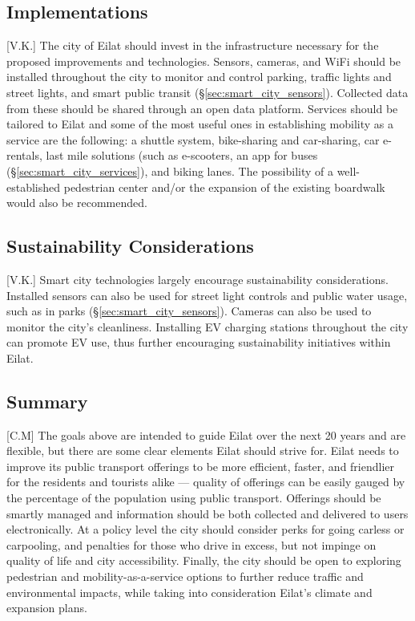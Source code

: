 \documentclass[12pt]{article}                       %
\begin{document}
\subsection{Implementations}[V.K.]
The city of Eilat should invest in the infrastructure necessary for the proposed improvements and technologies. Sensors, cameras, and WiFi should be installed throughout the city to monitor and control parking, traffic lights and street lights, and smart public transit (\S\ref{sec:smart_city_sensors}). Collected data from these should be shared through an open data platform. Services should be tailored to Eilat and some of the most useful ones in establishing mobility as a service are the following: a shuttle system, bike-sharing and car-sharing, car e-rentals, last mile solutions (such as e-scooters, an app for buses (\S\ref{sec:smart_city_services}), and biking lanes. The possibility of a well-established pedestrian center and/or the expansion of the existing boardwalk would also be recommended. 



\subsection{Sustainability Considerations}[V.K.]
Smart city technologies largely encourage sustainability considerations. Installed sensors can also be used for street light controls and public water usage, such as in parks (\S\ref{sec:smart_city_sensors}). Cameras can also be used to monitor the city's cleanliness. Installing EV charging stations throughout the city can promote EV use, thus further encouraging sustainability initiatives within Eilat. 

\subsection{Summary}[C.M]
The goals above are intended to guide Eilat over the next 20 years and are flexible, but there are some clear elements Eilat should strive for. Eilat needs to improve its public transport offerings to be more efficient, faster, and friendlier for the residents and tourists alike --- quality of offerings can be easily gauged by the percentage of the population using public transport. Offerings should be smartly managed and information should be both collected and delivered to users electronically. At a policy level the city should consider perks for going carless or carpooling, and penalties for those who drive in excess, but not impinge on quality of life and city accessibility. Finally, the city should be open to exploring pedestrian and mobility-as-a-service options to further reduce traffic and environmental impacts, while taking into consideration Eilat's climate and expansion plans.
\end{document}
